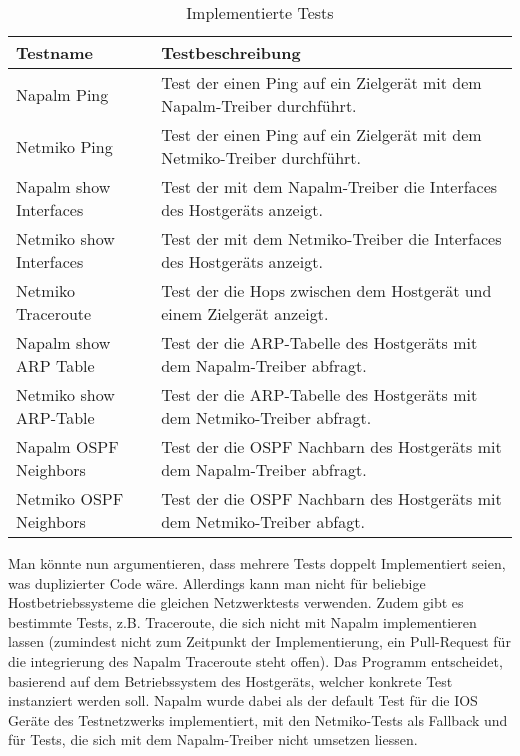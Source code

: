 \documentclass[]{subfiles}
\begin{document}
\begin{table}[h!]
    \begin{tabularx}{\textwidth}{lX}
        \toprule
        Testname & Testbeschreibung \\
        \midrule
        Napalm Ping & Test der einen Ping auf ein Zielgerät mit dem Napalm-Treiber durchführt.\\
        Netmiko Ping & Test der einen Ping auf ein Zielgerät mit dem Netmiko-Treiber durchführt. \\
        Napalm show Interfaces & Test der mit dem Napalm-Treiber die Interfaces des Hostgeräts anzeigt.\\
        Netmiko show Interfaces & Test der mit dem Netmiko-Treiber die Interfaces des Hostgeräts anzeigt.\\
        Netmiko Traceroute & Test der die Hops zwischen dem Hostgerät und einem Zielgerät anzeigt.\\
        Napalm show ARP Table & Test der die ARP-Tabelle des Hostgeräts mit dem Napalm-Treiber abfragt. \\
        Netmiko show ARP-Table & Test der die ARP-Tabelle des Hostgeräts mit dem Netmiko-Treiber abfragt. \\
        Napalm OSPF Neighbors & Test der die OSPF Nachbarn des Hostgeräts mit dem Napalm-Treiber abfragt. \\
        Netmiko OSPF Neighbors & Test der die OSPF Nachbarn des Hostgeräts mit dem Netmiko-Treiber abfagt. \\
        \bottomrule
    \end{tabularx}
    \caption{Implementierte Tests}
\end{table}


Man könnte nun argumentieren, dass mehrere Tests doppelt Implementiert seien, was duplizierter Code wäre.
Allerdings kann man nicht für beliebige Hostbetriebssysteme die gleichen Netzwerktests verwenden.
Zudem gibt es bestimmte Tests, z.B. Traceroute, die sich nicht mit Napalm implementieren lassen
(zumindest nicht zum Zeitpunkt der Implementierung, ein Pull-Request für die integrierung des 
Napalm Traceroute steht offen).
Das Programm entscheidet, basierend auf dem Betriebssystem des Hostgeräts, welcher 
konkrete Test instanziert werden soll. 
Napalm wurde dabei als der default Test für die IOS Geräte des Testnetzwerks implementiert,
mit den Netmiko-Tests als Fallback und für Tests, die sich mit dem Napalm-Treiber nicht umsetzen liessen.
\end{document}

